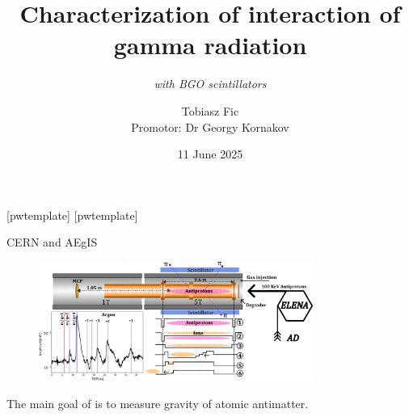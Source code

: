 


\title{Characterization of interaction of gamma radiation }
    \subtitle{\textit{with BGO scintillators}}
\author[T. Fic]{Tobiasz Fic\\ \vspace{5pt} \footnotesize Promotor: Dr Georgy Kornakov}

\date{11 June 2025}



\begin{frame}
    \maketitle
\end{frame}

[pwtemplate]
[pwtemplate]

\begin{frame}{CERN and AEgIS}
    \begin{figure}
        \centering
        \includegraphics[width=0.8\textwidth, frame]{images/AEGIS_IonTrap.png}
    \end{figure}
    The main goal of \aegis is to measure gravity of atomic antimatter.
\end{frame}


